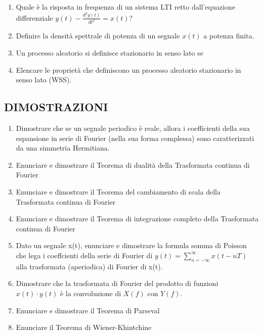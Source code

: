 \documentclass[12pt
]{article}
\begin{document}
\begin{enumerate}
\item
Quale è la risposta in frequenza di un sistema LTI retto
dall'equazione differenziale $y(t) - \frac{d^{2}y(t)}{dt^2} = x(t)$?
\item
Definire la densità spettrale di potenza di un segnale \(x(t)\) a
potenza finita.
\item
Un processo aleatorio si definisce stazionario in senso lato se
\item
Elencare le proprietà che definiscono un processo aleatorio
stazionario in senso lato (WSS).
  
\end{enumerate}

\hypertarget{dimostrazioni}{%
\subsection{DIMOSTRAZIONI}\label{dimostrazioni}}

\begin{enumerate}
\def\labelenumi{\arabic{enumi}.}

\item
Dimostrare che se un segnale periodico è reale, allora i coefficienti
della sua espansione in serie di Fourier (nella sua forma complessa)
sono caratterizzati da una simmetria Hermitiana.
\item
  Enunciare e dimostrare il Teorema di dualità della Trasformata
  continua di Fourier
\item
  Enunciare e dimostrare il Teorema del cambiamento di scala della
  Trasformata continua di Fourier
\item
  Enunciare e dimostrare il Teorema di integrazione completo della
  Trasformata continua di Fourier


\item
  Dato un segnale x(t), enunciare e dimostrare la formula somma di
  Poisson che lega i coeffcienti della serie di Fourier di \(\displaystyle y(t) = \sum_{n = -\infty}^{\infty} x(t - nT)\)
  alla trasformata (aperiodica) di Fourier di x(t).
\item
  Dimostrare che la trasformata di Fourier del prodotto di funzioni
  \(x(t) \cdot y(t)\) è la convoluzione di \(X(f)\) con \(Y (f)\).

\item
Enunciare e dimostrare il Teorema di Parseval
\item
  Enunciare il Teorema di Wiener-Khintchine
\end{enumerate}

\newpage
\end{document}
